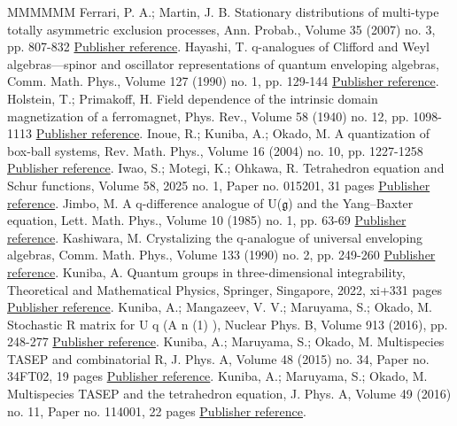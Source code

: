 \begin{thebibliography}{MMMMMM}
 Ferrari, P. A.; Martin, J. B. Stationary distributions of multi-type totally asymmetric exclusion processes, Ann. Probab., Volume 35 (2007) no. 3, pp. 807-832 \href{https://alco.centre-mersenne.org/articles/10.5802/alco.457/#FM}{Publisher reference}.
 Hayashi, T. q-analogues of Clifford and Weyl algebras—spinor and oscillator representations of quantum enveloping algebras, Comm. Math. Phys., Volume 127 (1990) no. 1, pp. 129-144 \href{https://alco.centre-mersenne.org/articles/10.5802/alco.457/#Hayashi90}{Publisher reference}.
 Holstein, T.; Primakoff, H. Field dependence of the intrinsic domain magnetization of a ferromagnet, Phys. Rev., Volume 58 (1940) no. 12, pp. 1098-1113 \href{https://alco.centre-mersenne.org/articles/10.5802/alco.457/#HP}{Publisher reference}.
 Inoue, R.; Kuniba, A.; Okado, M. A quantization of box-ball systems, Rev. Math. Phys., Volume 16 (2004) no. 10, pp. 1227-1258 \href{https://alco.centre-mersenne.org/articles/10.5802/alco.457/#IKO}{Publisher reference}.
 Iwao, S.; Motegi, K.; Ohkawa, R. Tetrahedron equation and Schur functions, Volume 58, 2025 no. 1, Paper no. 015201, 31 pages \href{https://alco.centre-mersenne.org/articles/10.5802/alco.457/#IMO}{Publisher reference}.
 Jimbo, M. A q-difference analogue of U(\(\mathfrak{g}\)) and the Yang–Baxter equation, Lett. Math. Phys., Volume 10 (1985) no. 1, pp. 63-69 \href{https://alco.centre-mersenne.org/articles/10.5802/alco.457/#J1}{Publisher reference}.
 Kashiwara, M. Crystalizing the q-analogue of universal enveloping algebras, Comm. Math. Phys., Volume 133 (1990) no. 2, pp. 249-260 \href{https://alco.centre-mersenne.org/articles/10.5802/alco.457/#Kashiwara90}{Publisher reference}.
 Kuniba, A. Quantum groups in three-dimensional integrability, Theoretical and Mathematical Physics, Springer, Singapore, 2022, xi+331 pages \href{https://alco.centre-mersenne.org/articles/10.5802/alco.457/#K22}{Publisher reference}.
 Kuniba, A.; Mangazeev, V. V.; Maruyama, S.; Okado, M. Stochastic R matrix for U q (A n (1) ), Nuclear Phys. B, Volume 913 (2016), pp. 248-277 \href{https://alco.centre-mersenne.org/articles/10.5802/alco.457/#KMMO}{Publisher reference}.
 Kuniba, A.; Maruyama, S.; Okado, M. Multispecies TASEP and combinatorial R, J. Phys. A, Volume 48 (2015) no. 34, Paper no. 34FT02, 19 pages \href{https://alco.centre-mersenne.org/articles/10.5802/alco.457/#KMO1}{Publisher reference}.
 Kuniba, A.; Maruyama, S.; Okado, M. Multispecies TASEP and the tetrahedron equation, J. Phys. A, Volume 49 (2016) no. 11, Paper no. 114001, 22 pages \href{https://alco.centre-mersenne.org/articles/10.5802/alco.457/#KMO2}{Publisher reference}.

\end{thebibliography}
